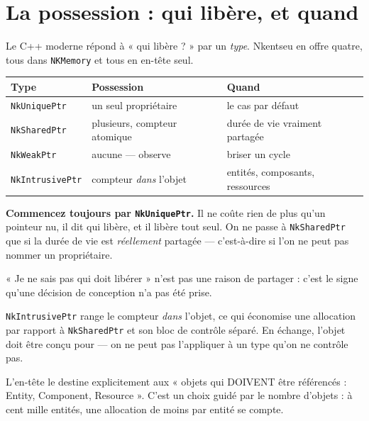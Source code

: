 \section{La possession : qui libère, et quand}

Le C++ moderne répond à « qui libère ? » par un \emph{type}. Nkentseu en offre
quatre, tous dans \texttt{NKMemory} et tous en en-tête seul.

\begin{center}
\begin{tabular}{@{}lll@{}}
\toprule
\textbf{Type} & \textbf{Possession} & \textbf{Quand} \\
\midrule
\texttt{NkUniquePtr} & un seul propriétaire & le cas par défaut \\
\texttt{NkSharedPtr} & plusieurs, compteur atomique & durée de vie vraiment partagée \\
\texttt{NkWeakPtr} & aucune --- observe & briser un cycle \\
\texttt{NkIntrusivePtr} & compteur \emph{dans} l'objet & entités, composants, ressources \\
\bottomrule
\end{tabular}
\end{center}

\begin{nkretenir}
\textbf{Commencez toujours par \texttt{NkUniquePtr}.} Il ne coûte rien de plus
qu'un pointeur nu, il dit qui libère, et il libère tout seul. On ne passe à
\texttt{NkSharedPtr} que si la durée de vie est \emph{réellement} partagée ---
c'est-à-dire si l'on ne peut pas nommer un propriétaire.

« Je ne sais pas qui doit libérer » n'est pas une raison de partager : c'est le
signe qu'une décision de conception n'a pas été prise.
\end{nkretenir}

\begin{nkretenir}
\texttt{NkIntrusivePtr} range le compteur \emph{dans} l'objet, ce qui économise
une allocation par rapport à \texttt{NkSharedPtr} et son bloc de contrôle
séparé. En échange, l'objet doit être conçu pour --- on ne peut pas l'appliquer à
un type qu'on ne contrôle pas.

L'en-tête le destine explicitement aux « objets qui DOIVENT être référencés :
Entity, Component, Resource ». C'est un choix guidé par le nombre d'objets : à
cent mille entités, une allocation de moins par entité se compte.
\end{nkretenir}

